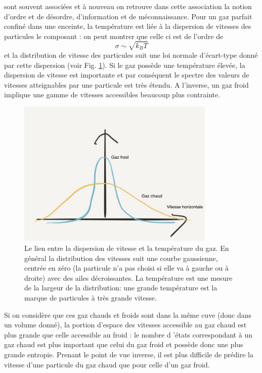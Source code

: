  sont souvent associées et à nouveau on retrouve dans cette association la notion d'ordre et de désordre, d'information et de méconnaissance. Pour un gaz parfait confiné dans une enceinte, la température est liée à la dispersion de vitesses des particules le composant : on peut montrer que celle ci est de l'ordre de
\begin{equation}
\sigma \sim \sqrt{k_B T}
\end{equation}
et la distribution de vitesse des particules suit une loi normale d'écart-type donné par cette dispersion (voir Fig. \ref{f:disp}). Si le gaz possède une température élevée, la dispersion de vitesse est importante et par conséquent le spectre des valeurs de vitesses atteignables par une particule est très étendu. A l'inverse, un gaz froid implique une gamme de vitesses accessibles beaucoup plus contrainte.
\begin{figure}[htbp]
	\centering
		\includegraphics[height=7cm]{figs/dispersion.png}
	\caption[Le lien entre la dispersion de vitesse et la température du gaz. ]{Le lien entre la dispersion de vitesse et la température du gaz. En général la distribution des vitesses suit une courbe gaussienne, centrée en zéro (la particule n'a pas choisi si elle va à gauche ou à droite) avec des ailes décroissantes. La température est une mesure de la largeur de la distribution: une grande température est la marque de particules à très grande vitesse.}
	\label{f:disp}
\end{figure}
Si on considère que ces gaz chauds et froids sont dans la même cuve (donc dans un volume donné), la portion d'espace des vitesses accessible au gaz chaud est plus grande que celle accessible au froid : le nombre d 'états correspondant à un gaz chaud est plus important que celui du gaz froid et possède donc une plus grande entropie. Prenant le point de vue inverse, il est plus difficile de prédire la vitesse d'une particule du gaz chaud que pour celle d'un gaz froid. 

